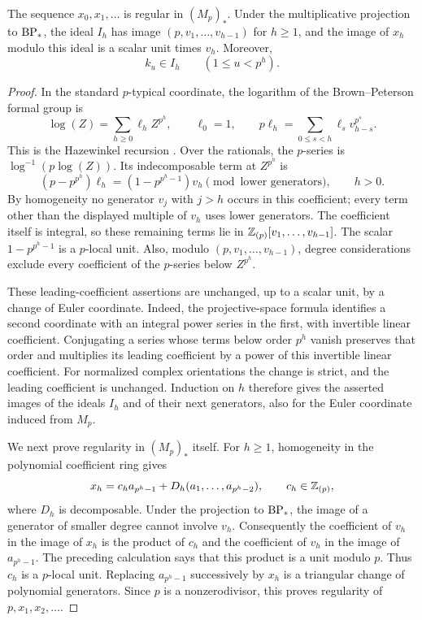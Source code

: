 \begin{lemma}
 \label{cob:regularity}
 The sequence $x_0,x_1,\ldots$ is regular in $(M_p)_*$.
 Under the multiplicative projection to $\mathrm{BP}_*$, the ideal $I_h$ has
 image $(p,v_1,\ldots,v_{h-1})$ for $h\geq 1$, and the image of $x_h$
 modulo this ideal is a scalar unit times $v_h$.  Moreover,
 \[
  k_u\in I_h\qquad(1\leq u<p^h).
 \]
\end{lemma}

\begin{proof}
 In the standard $p$-typical coordinate, the logarithm of the
 Brown--Peterson formal group is
 \[
  \log(Z)=\sum_{h\geq 0}\ell_hZ^{p^h},\qquad \ell_0=1,
  \qquad
  p\ell_h=\sum_{0\leq s<h}\ell_s v_{h-s}^{p^s}.
 \]
 This is the Hazewinkel recursion
 \cite[Section~3.1, Equations~(3.1.1)--(3.1.3)]{HazewinkelIII}.
 Over the rationals, the $p$-series is
 $\log^{-1}(p\log(Z))$.  Its indecomposable term at $Z^{p^h}$ is
 \[
  (p-p^{p^h})\ell_h
   =(1-p^{p^h-1})v_h
       \pmod{\text{lower generators}},\qquad h>0.
 \]
 By homogeneity no generator $v_j$ with $j>h$ occurs in this
 coefficient; every term other than the displayed multiple of $v_h$
 uses lower generators.  The coefficient itself is integral, so these
 remaining terms lie in $\mathbb Z_{(p)}[v_1,\ldots,v_{h-1}]$.
 The scalar $1-p^{p^h-1}$ is a $p$-local unit.  Also, modulo
 $(p,v_1,\ldots,v_{h-1})$, degree considerations exclude every
 coefficient of the $p$-series below $Z^{p^h}$.

 These leading-coefficient assertions are unchanged, up to a scalar
 unit, by a change of Euler coordinate.  Indeed, the projective-space
 formula identifies a second coordinate with an integral power series
 in the first, with invertible linear coefficient.  Conjugating a
 series whose terms below order $p^h$ vanish preserves that order and
 multiplies its leading coefficient by a power of this invertible
 linear coefficient.  For normalized complex orientations the change
 is strict, and the leading coefficient is unchanged.  Induction on
 $h$ therefore gives the asserted images of the ideals $I_h$ and of
 their next generators, also for the Euler coordinate induced from
 $M_p$.

 We next prove regularity in $(M_p)_*$ itself. For $h\geq1$, homogeneity in the
 polynomial coefficient ring gives
 \[
  x_h=c_h a_{p^h-1}
       +D_h(a_1,\ldots,a_{p^h-2}),\qquad c_h\in\mathbb Z_{(p)},
 \]
 where $D_h$ is decomposable.  Under the projection to $\mathrm{BP}_*$, the
 image of a generator of smaller degree cannot involve $v_h$.
 Consequently the coefficient of $v_h$ in the image of $x_h$ is the
 product of $c_h$ and the coefficient of $v_h$ in the image of
 $a_{p^h-1}$.  The preceding calculation says that this product is a
 unit modulo $p$.  Thus $c_h$ is a $p$-local unit.  Replacing
 $a_{p^h-1}$ successively by $x_h$ is a triangular change of polynomial
 generators.  Since $p$ is a nonzerodivisor, this proves regularity of
 $p,x_1,x_2,\ldots$.


\end{proof}
